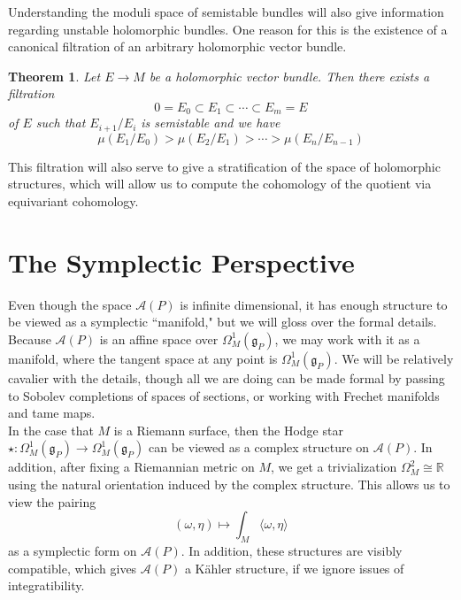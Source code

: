 \documentclass[psamsfonts, 12pt]{amsart}
\newtheorem{thm}{Theorem}[section]
\theoremstyle{definition}
\theoremstyle{remark}
\newcommand{\R}{\mathbb{R}}
\newcommand{\g}{\mathfrak{g}}
\begin{document}
Understanding the moduli space of semistable bundles will also give
information regarding unstable holomorphic bundles. One reason for this is
the existence of a canonical filtration of an arbitrary holomorphic vector bundle.
%
\begin{thm}
Let $E \to M$ be a holomorphic vector bundle. Then there exists a filtration
\[
0 = E_0 \subset E_1 \subset \cdots \subset E_m = E
\]
of $E$ such that $E_{i+1}/E_i$ is semistable and we have
\[
\mu(E_1/E_0) > \mu(E_2/E_1) > \cdots > \mu(E_n/E_{n-1})
\]
\end{thm}
%
This filtration will also serve to give a stratification of the space of holomorphic
structures, which will allow us to compute the cohomology of the quotient via
equivariant cohomology.
%
\section{The Symplectic Perspective}
%
Even though the space $\mathscr{A}(P)$ is infinite dimensional, it has enough structure
to be viewed as a symplectic ``manifold," but we will gloss over the formal details.
Because $\mathcal{A}(P)$ is an affine space over $\Omega_M^1(\g_P)$, we may
work with it as a manifold, where the tangent space at any point is $\Omega_M^1(\g_P)$.
We will be relatively cavalier with the details, though all we are doing can be made
formal by passing to Sobolev completions of spaces of sections, or working with
Frechet manifolds and tame maps.\\

In the case that $M$ is a Riemann surface, then the Hodge star
$\star : \Omega^1_M(\g_P) \to \Omega^1_M(\g_P)$ can be viewed as a complex
structure on $\mathscr{A}(P)$. In addition, after fixing a Riemannian metric on $M$,
we get a trivialization $\Omega_M^2 \cong \R$ using the natural orientation induced
by the complex structure. This allows us to view the pairing
\[
(\omega,\eta) \mapsto \int_M \langle\omega,\eta\rangle
\]
as a symplectic form on $\mathscr{A}(P)$. In addition, these structures are
visibly compatible, which gives $\mathscr{A}(P)$ a K\"ahler structure, if we
ignore issues of integratibility. \\
\end{document}
